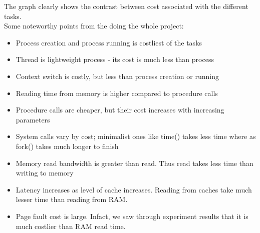 \documentclass[conference]{IEEEtran}
\begin{document}
The graph clearly shows the contrast between cost associated with the different tasks.\\
Some noteworthy points from the doing the whole project:
\begin{itemize}

\item
Process creation and process running is costliest of the tasks

\item
Thread is lightweight process - its cost is much less than process

\item
Context switch is costly, but less than process creation or running

\item
Reading time from memory is higher compared to procedure calls 

\item
Procedure calls are cheaper, but their cost increases with increasing parameters

\item
System calls vary by cost; minimalist ones like time() takes less time where as fork() takes much longer to finish

\item
Memory read bandwidth is greater than read. Thus read takes less time than writing to memory

\item
Latency increases as level of cache increases. Reading from caches take much lesser time than reading from RAM.

\item
Page fault cost is large. Infact, we saw through experiment results that it is much costlier than RAM read time.

\end{itemize}









\ifCLASSOPTIONcaptionsoff
  \newpage
\fi


\clearpage
\end{document}
